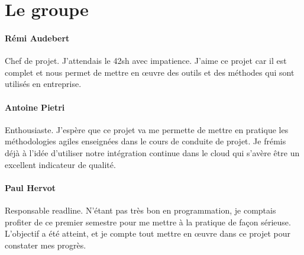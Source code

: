 \section{Le groupe}

\paragraph{Rémi Audebert} Chef de projet. J'attendais le 42sh avec impatience.
J'aime ce projet car il est complet et nous permet de mettre en œuvre des
outils et des méthodes qui sont utilisés en entreprise.

\paragraph{Antoine Pietri} Enthousiaste. J'espère que ce projet va me permette
de mettre en pratique les méthodologies agiles enseignées dans le cours de
conduite de projet. Je frémis déjà à l'idée d'utiliser notre intégration
continue dans le cloud qui s'avère être un excellent indicateur de qualité.

\paragraph{Paul Hervot} Responsable readline. N'étant pas très bon en
programmation, je comptais profiter de ce premier semestre pour me mettre à la
pratique de façon sérieuse. L'objectif a été atteint, et je compte tout mettre
en œuvre dans ce projet pour constater mes progrès.
